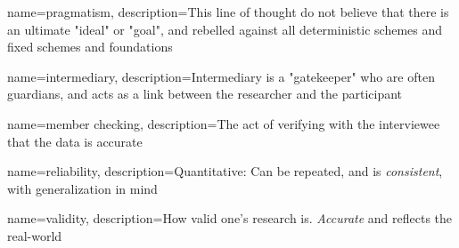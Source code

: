 {
	name={pragmatism},
	description={This line of thought do not believe that there is an ultimate "ideal" or "goal", and rebelled against all deterministic schemes and fixed schemes and foundations\parencite{bredo_philosophies_2006}}
}


{
	name={intermediary},
	description={Intermediary is a "gatekeeper" who are often guardians,  and acts as a link between the researcher and the participant}
}

{
	name={member checking},
	description={The act of verifying with the interviewee that the data is accurate}
}

{
	name={reliability},
	description={Quantitative: Can be repeated, and is \emph{consistent}, with generalization in mind}
}

{
	name={validity},
	description={How valid one's research is. \emph{Accurate} and reflects the real-world}
}